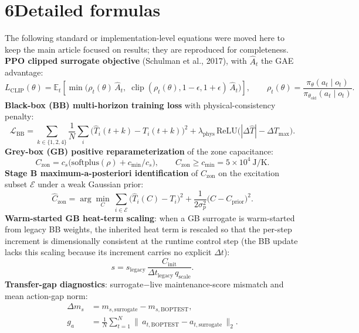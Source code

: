 \documentclass[11pt,a4paper]{article}
\newcommand{\Czon}{\ensuremath{C_{\mathrm{zon}}}}
\newcommand{\That}{\ensuremath{\widehat{T}}}
\begin{document}
\section*{6\quad Detailed formulas}
The following standard or implementation-level equations were moved here to keep the main
article focused on results; they are reproduced for completeness.
\noindent\textbf{PPO clipped surrogate objective} (Schulman et al., 2017), with $\hat{A}_t$ the GAE advantage:
\begin{equation}
L_{\mathrm{CLIP}}(\theta)=\mathbb{E}_t\!\left[\min\!\big(\rho_t(\theta)\,\hat{A}_t,\;
\operatorname{clip}(\rho_t(\theta),1-\epsilon,1+\epsilon)\,\hat{A}_t\big)\right],
\qquad \rho_t(\theta)=\frac{\pi_\theta(a_t\mid o_t)}{\pi_{\theta_{\mathrm{old}}}(a_t\mid o_t)}.
\end{equation}
\noindent\textbf{Black-box (BB) multi-horizon training loss} with physical-consistency penalty:
\begin{equation}
 \mathcal{L}_{\mathrm{BB}}
 = \sum_{k\in\{1,2,4\}} \frac{1}{N}\sum_{i}\big(\That_i(t{+}k)-T_i(t{+}k)\big)^2
 + \lambda_{\mathrm{phys}}\,\mathrm{ReLU}\!\big(|\Delta\That|-\Delta T_{\max}\big).
\end{equation}
\noindent\textbf{Grey-box (GB) positive reparameterization} of the zone capacitance:
\begin{equation}
 \Czon = c_s\big(\mathrm{softplus}(\rho) + c_{\min}/c_s\big),
 \qquad \Czon \ge c_{\min} = 5\times10^4~\mathrm{J/K}.
\end{equation}
\noindent\textbf{Stage B maximum-a-posteriori identification} of $\Czon$ on the excitation subset $\mathcal{E}$ under a weak Gaussian prior:
\begin{equation}
 \widehat{C}_{\mathrm{zon}}
 = \arg\min_{C}\ \sum_{i\in\mathcal{E}}\big(\That_i(C)-T_i\big)^2
 + \frac{1}{2\sigma_p^2}\big(C-C_{\mathrm{prior}}\big)^2.
\end{equation}
\noindent\textbf{Warm-started GB heat-term scaling}: when a GB surrogate is warm-started from legacy BB weights, the inherited heat term is rescaled so that the per-step increment is dimensionally consistent at the runtime control step (the BB update lacks this scaling because its increment carries no explicit $\Delta t$):
\begin{equation}
 s = s_{\mathrm{legacy}}\,\frac{C_{\mathrm{init}}}{\Delta t_{\mathrm{legacy}}\,q_{\mathrm{scale}}}.
\end{equation}
\noindent\textbf{Transfer-gap diagnostics}: surrogate$-$live maintenance-score mismatch and mean action-gap norm:
\begin{equation}
\begin{aligned}
 \Delta m_s &= m_{s,\mathrm{surrogate}} - m_{s,\mathrm{BOPTEST}}, \\
 g_a &= \frac{1}{N}\sum_{t=1}^{N}\big\|\,a_{t,\mathrm{BOPTEST}}-a_{t,\mathrm{surrogate}}\,\big\|_{2}.
\end{aligned}
\end{equation}
\end{document}
